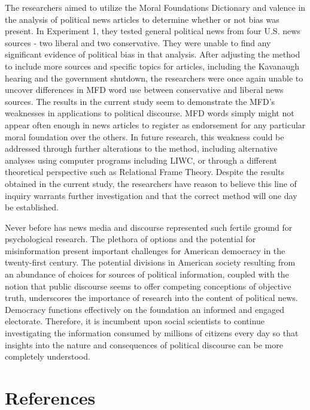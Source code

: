\documentclass[english,,man]{apa6}
\begin{document}
The researchers aimed to utilize the Moral Foundations Dictionary and valence in the analysis of political news articles to determine whether or not bias was present. In Experiment 1, they tested general political news from four U.S. news sources - two liberal and two conservative. They were unable to find any significant evidence of political bias in that analysis. After adjusting the method to include more sources and specific topics for articles, including the Kavanaugh hearing and the government shutdown, the researchers were once again unable to uncover differences in MFD word use between conservative and liberal news sources. The results in the current study seem to demonstrate the MFD's weaknesses in applications to political discourse. MFD words simply might not appear often enough in news articles to register as endorsement for any particular moral foundation over the others. In future research, this weakness could be addressed through further alterations to the method, including alternative analyses using computer programs including LIWC, or through a different theoretical perspective such as Relational Frame Theory. Despite the results obtained in the current study, the researchers have reason to believe this line of inquiry warrants further investigation and that the correct method will one day be established.

Never before has news media and discourse represented such fertile ground for psychological research. The plethora of options and the potential for misinformation present important challenges for American democracy in the twenty-first century. The potential divisions in American society resulting from an abundance of choices for sources of political information, coupled with the notion that public discourse seems to offer competing conceptions of objective truth, underscores the importance of research into the content of political news. Democracy functions effectively on the foundation an informed and engaged electorate. Therefore, it is incumbent upon social scientists to continue investigating the information consumed by millions of citizens every day so that insights into the nature and consequences of political discourse can be more completely understood.

\newpage

\hypertarget{references}{%
\section{References}\label{references}}
\end{document}
